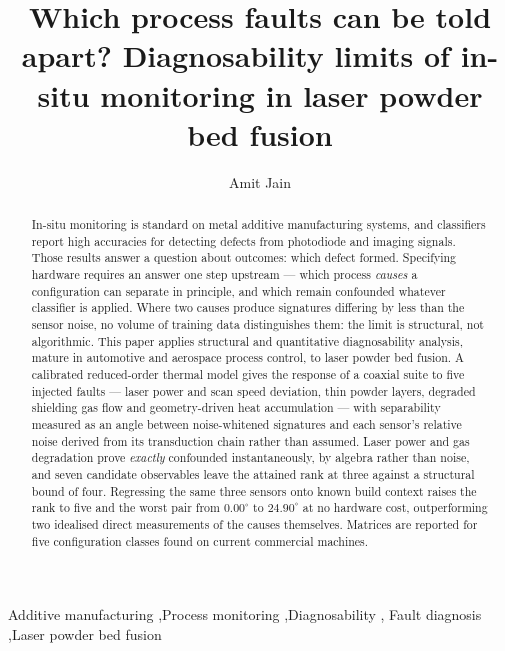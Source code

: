 \documentclass[final,5p,times,twocolumn]{elsarticle}
\begin{document}
\begin{frontmatter}

\title{Which process faults can be told apart? Diagnosability limits of
in-situ monitoring in laser powder bed fusion}

\author[a]{Amit Jain}

\begin{abstract}
In-situ monitoring is standard on metal additive manufacturing systems, and
classifiers report high accuracies for detecting defects from photodiode and
imaging signals. Those results answer a question about outcomes: which defect
formed. Specifying hardware requires an answer one step upstream --- which process
\emph{causes} a configuration can separate in principle, and which remain
confounded whatever classifier is applied. Where two causes produce signatures
differing by less than the sensor noise, no volume of training data distinguishes
them: the limit is structural, not algorithmic. This paper applies structural and
quantitative diagnosability analysis, mature in automotive and aerospace process
control, to laser powder bed fusion. A calibrated reduced-order thermal model
gives the response of a coaxial suite to five injected faults --- laser power and
scan speed deviation, thin powder layers, degraded shielding gas flow and
geometry-driven heat accumulation --- with separability measured as an angle
between noise-whitened signatures and each sensor's relative noise derived from
its transduction chain rather than assumed. Laser power and gas degradation prove
\emph{exactly} confounded instantaneously, by algebra rather than noise, and
seven candidate observables leave the attained rank at three against a structural
bound of four. Regressing the same three sensors onto known build context raises
the rank to five and the worst pair from $0.00^\circ$ to $24.90^\circ$ at no
hardware cost, outperforming two idealised direct measurements of the causes
themselves. Matrices are reported for five configuration classes found on current
commercial machines.
\end{abstract}

\begin{keyword}
Additive manufacturing \sep Process monitoring \sep Diagnosability \sep
Fault diagnosis \sep Laser powder bed fusion
\end{keyword}

\end{frontmatter}
\end{document}
